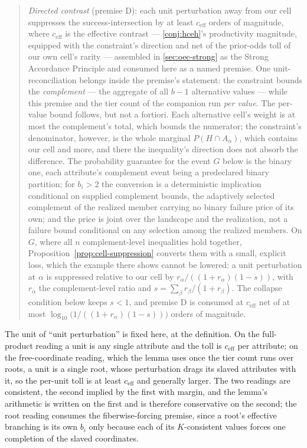 \documentclass[11pt]{article}
\theoremstyle{definition}
\begin{document}
\begin{quote}
\emph{Directed contrast} (premise D): each unit perturbation away from our cell suppresses the success-intersection by at least $c_{\mathrm{eff}}$ orders of magnitude, where $c_{\mathrm{eff}}$ is the effective contrast --- \autoref{conj:hceh}'s productivity magnitude, equipped with the constraint's direction and net of the prior-odds toll of our own cell's rarity --- assembled in \autoref{sec:oec-strong} as the Strong Accordance Principle and consumed here as a named premise. One unit-reconciliation belongs inside the premise's statement: the constraint bounds the \emph{complement} --- the aggregate of all $b-1$ alternative values --- while this premise and the tier count of the companion \cite{Nexus} run \emph{per value}. The per-value bound follows, but not a fortiori. Each alternative cell's weight is at most the complement's total, which bounds the numerator; the constraint's denominator, however, is the whole marginal $P(H \cap A_\alpha)$, which contains our cell and more, and there the inequality's direction does not absorb the difference. The probability guarantee for the event $G$ below is the binary one, each attribute's complement event being a predeclared binary partition; for $b_i > 2$ the conversion is a deterministic implication conditional on supplied complement bounds, the adaptively selected complement of the realized member carrying no binary failure price of its own; and the price is joint over the landscape and the realization, not a failure bound conditional on any selection among the realized members. On $G$, where all $n$ complement-level inequalities hold together, Proposition~\ref{prop:cell-suppression} converts them with a small, explicit loss, which the example there shows cannot be lowered: a unit perturbation at $\alpha$ is suppressed relative to our cell by $r_\alpha/((1+r_\alpha)(1-s))$, with $r_\alpha$ the complement-level ratio and $s = \sum_\beta r_\beta/(1+r_\beta)$. The collapse condition below keeps $s < 1$, and premise D is consumed at $c_{\mathrm{eff}}$ net of at most $\log_{10}\big(1/((1+r_\alpha)(1-s))\big)$ orders of magnitude.
\end{quote}

The unit of ``unit perturbation'' is fixed here, at the definition. On the full-product reading a unit is any single attribute and the toll is $c_{\mathrm{eff}}$ per attribute; on the free-coordinate reading, which the lemma uses once the tier count runs over roots, a unit is a single root, whose perturbation drags its slaved attributes with it, so the per-unit toll is at least $c_{\mathrm{eff}}$ and generally larger. The two readings are consistent, the second implied by the first with margin, and the lemma's arithmetic is written on the first and is therefore conservative on the second; the root reading consumes the fiberwise-forcing premise, since a root's effective branching is its own $b_i$ only because each of its $K$-consistent values forces one completion of the slaved coordinates.
\end{document}
